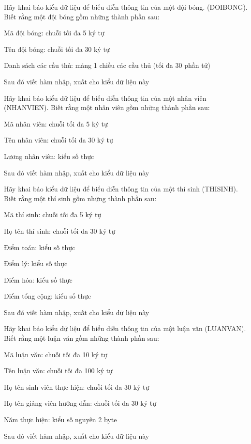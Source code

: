 \begin{problem}
    Hãy khai báo kiểu dữ liệu để biểu diễn thông tin của một đội bóng. (DOIBONG). Biết rằng một đội bóng gồm những thành phần sau:

Mã đội bóng: chuỗi tối đa 5 ký tự

Tên đội bóng: chuỗi tối đa 30 ký tự

Danh sách các cầu thủ: mảng 1 chiều các cầu thủ (tối đa 30 phần tử)

Sau đó viết hàm nhập, xuất cho kiểu dữ liệu này
\end{problem}
\begin{problem}
    Hãy khai báo kiểu dữ liệu để biểu diễn thông tin của một nhân viên (NHANVIEN). Biết rằng một nhân viên gồm những thành phần sau:

Mã nhân viên: chuỗi tối đa 5 ký tự

Tên nhân viên: chuỗi tối đa 30 ký tự

Lương nhân viên: kiểu số thực

Sau đó viết hàm nhập, xuất cho kiểu dữ liệu này

\end{problem}
\begin{problem}
    Hãy khai báo kiểu dữ liệu để biểu diễn thông tin của một thí sinh (THISINH). Biết rằng một thí sinh gồm những thành phần sau:

Mã thí sinh: chuỗi tối đa 5 ký tự

Họ tên thí sinh: chuỗi tối đa 30 ký tự

Điểm toán: kiểu số thực

Điểm lý: kiểu số thực

Điểm hóa: kiểu số thực

Điểm tổng cộng: kiểu số thực

Sau đó viết hàm nhập, xuất cho kiểu dữ liệu này
\end{problem}
\begin{problem}
    Hãy khai báo kiểu dữ liệu để biểu diễn thông tin của một luận văn (LUANVAN). Biết rằng một luận văn gồm những thành phần sau:

Mã luận văn: chuỗi tối đa 10 ký tự

Tên luận văn: chuỗi tối đa 100 ký tự

Họ tên sinh viên thực hiện: chuỗi tối đa 30 ký tự

Họ tên giảng viên hướng dẫn: chuỗi tối đa 30 ký tự

Năm thực hiện: kiểu số nguyên 2 byte

Sau đó viết hàm nhập, xuất cho kiểu dữ liệu này
\end{problem}
